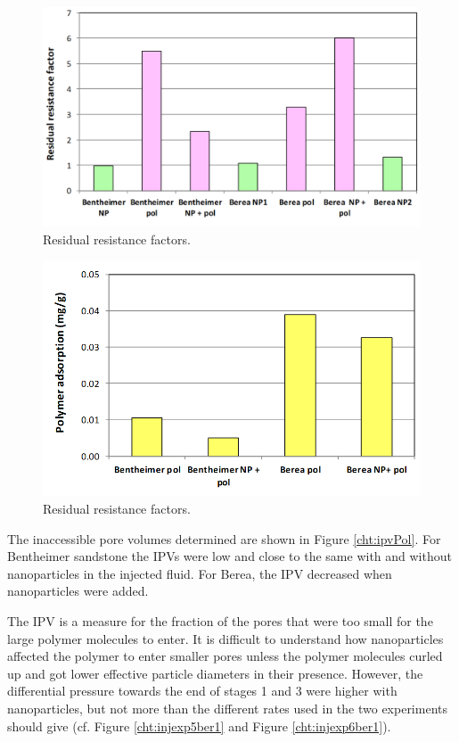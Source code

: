 \begin{figure}[p]
    \centering
    \includegraphics[width=\textwidth]{img/cht/rrf.png}
    \caption{Residual resistance factors.}
    \label{cht:rrf}
\end{figure}

\begin{figure}[p]
    \centering
    \includegraphics[width=\textwidth]{img/cht/polAds.png}
    \caption{Residual resistance factors.}
    \label{cht:polAds}
\end{figure}

The inaccessible pore volumes determined are shown in Figure \ref{cht:ipvPol}. For Bentheimer sandstone the IPVs were low and close to the same with and without nanoparticles in the injected fluid. For Berea, the IPV decreased when nanoparticles were added. 

The IPV is a measure for the fraction of the pores that were too small for the large polymer molecules to enter. It is difficult to understand how nanoparticles affected the polymer to enter smaller pores unless the polymer molecules curled up and got lower effective particle diameters in their presence. However, the differential pressure towards the end of stages 1 and 3 were higher with nanoparticles, but not more than the different rates used in the two experiments should give (cf. Figure \ref{cht:injexp5ber1} and Figure \ref{cht:injexp6ber1}). 

